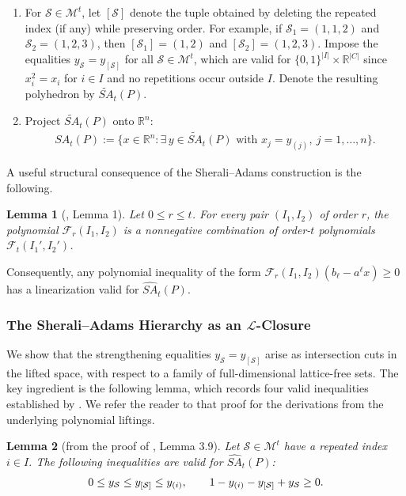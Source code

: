 \documentclass{article}
\newtheorem{lemma}{Lemma}
\newcommand{\R}{\mathbb{R}}
\newcommand{\F}{\mathcal{F}}
\newcommand{\M}{\mathcal{M}}
\renewcommand{\S}{\mathcal{S}}
\renewcommand{\L}{\mathcal{L}}
\begin{document}
\begin{enumerate}
    \item For $\S \in \M^t$, let $[\S]$ denote the tuple obtained by deleting the repeated index (if any) while preserving order. For example, if $\S_1 = (1,1,2)$ and $\S_2 = (1,2,3)$, then $[\S_1] = (1,2)$ and $[\S_2] = (1,2,3)$. Impose the equalities $y_\S = y_{[\S]}$ for all $\S \in \M^t$, which are valid for $\{0,1\}^{|I|} \times \R^{|C|}$ since $x_i^2 = x_i$ for $i \in I$ and no repetitions occur outside $I$. Denote the resulting polyhedron by $\widetilde{SA}_t(P)$.

    \item Project $\widetilde{SA}_t(P)$ onto $\R^n$:
    \begin{align}
        SA_t(P) := \{x \in \R^n : \exists\, y \in \widetilde{SA}_t(P) \text{ with } x_j = y_{(j)},\ j = 1,\ldots,n\}.
    \end{align}
\end{enumerate}

A useful structural consequence of the Sherali--Adams construction is the following.

\begin{lemma}[\cite{sherali1990hierarchy}, Lemma 1] \label{lemma:sa-order-r}
    Let $0 \leq r \leq t$. For every pair $(I_1, I_2)$ of order $r$, the polynomial $\F_r(I_1, I_2)$ is a nonnegative combination of order-$t$ polynomials $\F_t(I_1', I_2')$.
\end{lemma}
Consequently, any polynomial inequality of the form $\F_r(I_1, I_2)(b_\ell - {a^\ell} x) \geq 0$ 
has a linearization valid for $\widehat{SA}_t(P)$.

\subsubsection{The Sherali--Adams Hierarchy as an \texorpdfstring{$\L$}{L}-Closure} \label{subsec:sa-as-L}

We show that the strengthening equalities $y_\S = y_{[\S]}$ arise as intersection cuts in the lifted space, with respect to a family of full-dimensional lattice-free sets. The key ingredient is the following lemma, which records four valid inequalities established by \cite{bodur2017new}. We refer the reader to that proof for the derivations from the underlying polynomial liftings.

\begin{lemma}[{from the proof of \cite{bodur2017new}, Lemma 3.9}] \label{lemma:bodur-3.9}
    Let $\S \in \M^t$ have a repeated index $i \in I$. The following inequalities are valid for $\widehat{SA}_t(P)$:
    \begin{align}
        0 \leq y_\S \leq y_{[\S]} \leq y_{(i)}, \qquad 1 - y_{(i)} - y_{[\S]} + y_\S \geq 0. \notag
    \end{align}
\end{lemma}
\end{document}
